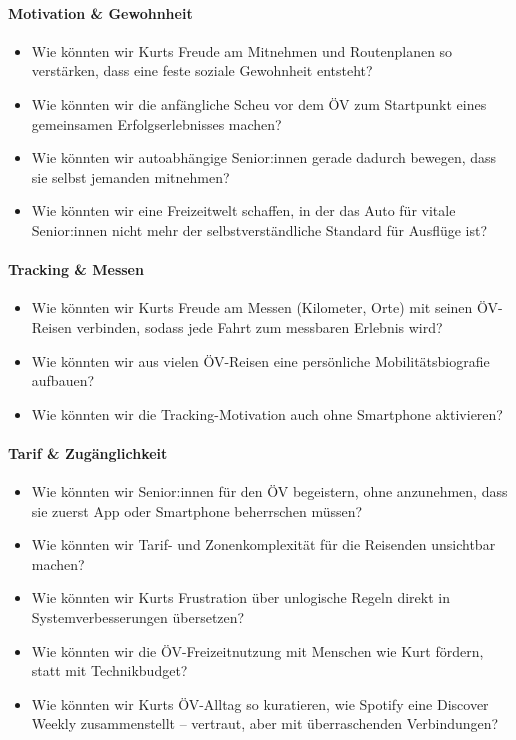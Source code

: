 \paragraph{Motivation \& Gewohnheit}
\begin{itemize}[nosep]
  \item Wie könnten wir Kurts Freude am Mitnehmen und Routenplanen so verstärken, dass eine feste soziale Gewohnheit entsteht?
  \item Wie könnten wir die anfängliche Scheu vor dem ÖV zum Startpunkt eines gemeinsamen Erfolgserlebnisses machen?
  \item Wie könnten wir autoabhängige Senior:innen gerade dadurch bewegen, dass sie selbst jemanden mitnehmen?
  \item Wie könnten wir eine Freizeitwelt schaffen, in der das Auto für vitale Senior:innen nicht mehr der selbstverständliche Standard für Ausflüge ist?
\end{itemize}

\paragraph{Tracking \& Messen}
\begin{itemize}[nosep]
  \item Wie könnten wir Kurts Freude am Messen (Kilometer, Orte) mit seinen ÖV-Reisen verbinden, sodass jede Fahrt zum messbaren Erlebnis wird?
  \item Wie könnten wir aus vielen ÖV-Reisen eine persönliche Mobilitätsbiografie aufbauen?
  \item Wie könnten wir die Tracking-Motivation auch ohne Smartphone aktivieren?
\end{itemize}

\paragraph{Tarif \& Zugänglichkeit}
\begin{itemize}[nosep]
  \item Wie könnten wir Senior:innen für den ÖV begeistern, ohne anzunehmen, dass sie zuerst App oder Smartphone beherrschen müssen?
  \item Wie könnten wir Tarif- und Zonenkomplexität für die Reisenden unsichtbar machen?
  \item Wie könnten wir Kurts Frustration über unlogische Regeln direkt in Systemverbesserungen übersetzen?
  \item Wie könnten wir die ÖV-Freizeitnutzung mit Menschen wie Kurt fördern, statt mit Technikbudget?
  \item Wie könnten wir Kurts ÖV-Alltag so kuratieren, wie Spotify eine Discover Weekly zusammenstellt -- vertraut, aber mit überraschenden Verbindungen?
\end{itemize}

